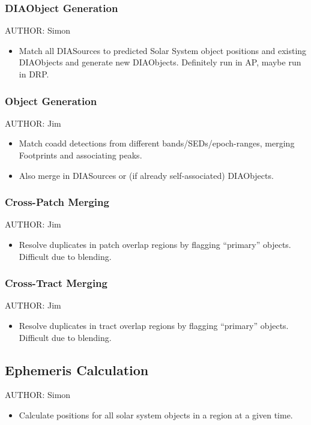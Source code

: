 \subsubsection{DIAObject Generation}
AUTHOR: Simon
\begin{itemize}
\item Match all DIASources to predicted Solar System object positions and existing DIAObjects and generate new DIAObjects.  Definitely run in AP, maybe run in DRP.
\end{itemize}

\subsubsection{Object Generation}
AUTHOR: Jim
\begin{itemize}
\item Match coadd detections from different bands/SEDs/epoch-ranges, merging Footprints and associating peaks.
\item Also merge in DIASources or (if already self-associated) DIAObjects.
\end{itemize}

\subsubsection{Cross-Patch Merging}
AUTHOR: Jim
\begin{itemize}
\item Resolve duplicates in patch overlap regions by flagging ``primary'' objects.  Difficult due to blending.
\end{itemize}

\subsubsection{Cross-Tract Merging}
AUTHOR: Jim
\begin{itemize}
\item Resolve duplicates in tract overlap regions by flagging ``primary'' objects.  Difficult due to blending.
\end{itemize}

\subsection{Ephemeris Calculation}
AUTHOR: Simon
\begin{itemize}
\item Calculate positions for all solar system objects in a region at a given time.
\end{itemize}

